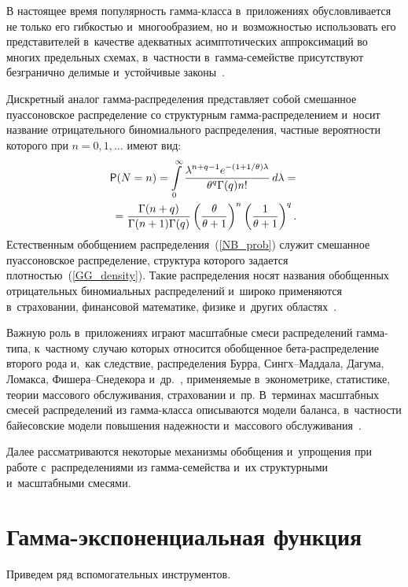 \begin{multicols}{2}
В настоящее время популярность гам\-ма-клас\-са в~приложениях обусловливается не 
только его гибкостью и~многообразием, но и~возможностью использовать его 
представителей в~качестве адекватных асимптотических аппроксимаций во многих 
предельных схемах, в~частности в~гам\-ма-се\-мей\-ст\-ве присутствуют безгранично 
делимые и~устойчивые законы~\cite{ZaKo2013}.

Дискретный аналог гам\-ма-рас\-пре\-де\-ле\-ния представляет собой смешанное пуассоновское 
распределение со структурным гам\-ма-рас\-пре\-де\-ле\-ни\-ем и~носит название 
отрицательного биномиального распределения, частные вероятности которого при 
$n=0,1,\ldots$ имеют вид:
\begin{multline}
\label{NB_prob}
{\sf P}(N=n)=\int\limits_0^\infty
\displaystyle\frac{\displaystyle \lambda^{n+q -1}e^{-
(1+1/\theta)\lambda}\mathstrut}{\displaystyle \theta^{q}\Gamma(q)n!\mathstrut}\,d\lambda={}\\
{}=
\displaystyle\frac{\displaystyle \Gamma(n+q)\mathstrut}{\displaystyle \Gamma(n+1)\Gamma(q)\mathstrut}\left(\displaystyle\frac{\displaystyle \theta\mathstrut}{\displaystyle \theta+1\mathstrut}\right)^n
\left(\displaystyle\frac{\displaystyle 1\mathstrut}{\displaystyle \theta+1\mathstrut}\right)^q.
\end{multline}
Естественным обобщением распределения~(\ref{NB_prob}) служит смешанное 
пуассоновское распределение, структура  которого задается плотностью~(\ref{GG_density}). 
Такие распределения носят названия обобщенных отрицательных 
биномиальных распределений и~широко применяются в~страховании, финансовой 
математике, физике и~других областях~\cite{KoZe2018}.

Важную роль в~приложениях играют масштабные смеси распределений гам\-ма-ти\-па, 
к~частному случаю которых относится обобщенное бе\-та-рас\-пре\-де\-ле\-ние второго рода 
и,~как следствие, распределения Бурра, Сингх--Мад\-да\-ла, Дагума, Ломакса, 
Фи\-ше\-ра--Сне\-де\-ко\-ра и~др.~\cite{Ku2019_1}, применяемые в~эконометрике, статистике, теории 
массового обслуживания, страховании и~пр. В~терминах масштабных смесей 
распределений из гамма-класса описываются модели баланса, в~частности 
байесовские модели повышения надежности и~массового обслуживания~\cite{Ku2018}.

Далее рассматриваются некоторые механизмы обобщения и~упрощения при работе 
с~распределениями из гам\-ма-се\-мей\-ст\-ва и~их структурными и~масштабными смесями.

\section{Гамма-экспоненциальная функция}


Приведем ряд вспомогательных инструментов.


\end{multicols}
